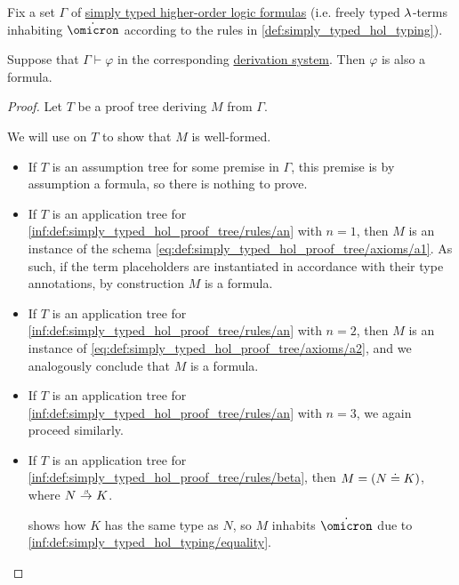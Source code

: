 \begin{proposition}\label{thm:simply_typed_hol_equal}
  Fix a set \( \Gamma \) of \hyperref[def:simply_typed_hol_formula]{simply typed higher-order logic formulas} (i.e. freely typed \( {\mathrm \lambda} \)-terms inhabiting \( \syn\omicron \) according to the rules in \cref{def:simply_typed_hol_typing}).

  Suppose that \( \Gamma \vdash \varphi \) in the corresponding \hyperref[def:simply_typed_hol_proof_tree]{derivation system}. Then \( \varphi \) is also a formula.
\end{proposition}
\begin{proof}
  Let \( T \) be a proof tree deriving \( M \) from \( \Gamma \).

  We will use  on \( T \) to show that \( M \) is well-formed.
  \begin{itemize}
    \item If \( T \) is an assumption tree for some premise in \( \Gamma \), this premise is by assumption a formula, so there is nothing to prove.

    \item If \( T \) is an application tree for \ref{inf:def:simply_typed_hol_proof_tree/rules/an} with \( n = 1 \), then \( M \) is an instance of the schema \eqref{eq:def:simply_typed_hol_proof_tree/axioms/a1}. As such, if the term placeholders are instantiated in accordance with their type annotations, by construction \( M \) is a formula.

    \item If \( T \) is an application tree for \ref{inf:def:simply_typed_hol_proof_tree/rules/an} with \( n = 2 \), then \( M \) is an instance of \eqref{eq:def:simply_typed_hol_proof_tree/axioms/a2}, and we analogously conclude that \( M \) is a formula.

    \item If \( T \) is an application tree for \ref{inf:def:simply_typed_hol_proof_tree/rules/an} with \( n = 3 \), we again proceed similarly.

    \item If \( T \) is an application tree for \ref{inf:def:simply_typed_hol_proof_tree/rules/beta}, then \( M = (N \doteq K) \), where \( N \bred K \).

     shows how \( K \) has the same type as \( N \), so \( M \) inhabits \( \syn\omicron \) due to \ref{inf:def:simply_typed_hol_typing/equality}.


\end{itemize}
\end{proof}
